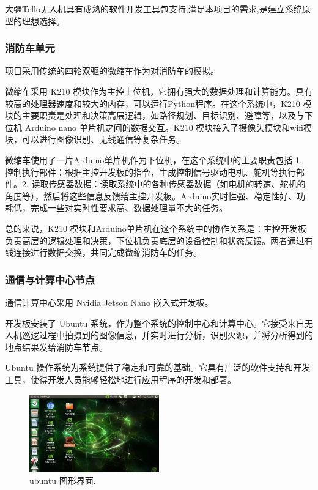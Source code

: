 \documentclass[12pt, a4paper, oneside]{article}
\begin{document}
大疆Tello无人机具有成熟的软件开发工具包支持,满足本项目的需求,是建立系统原型的理想选择。

\subsubsection{消防车单元}

项目采用传统的四轮双驱的微缩车作为对消防车的模拟。

微缩车采用 K210 模块作为主控上位机，它拥有强大的数据处理和计算能力。具有较高的处理器速度和较大的内存，可以运行Python程序。在这个系统中，K210 模块的主要职责是处理和决策高层逻辑，如路径规划、目标识别、避障等，以及与下位机 Arduino nano 单片机之间的数据交互。K210 模块接入了摄像头模块和wifi模块，可以进行图像识别、无线通信等复杂任务。

微缩车使用了一片Arduino单片机作为下位机，在这个系统中的主要职责包括 1. 控制执行部件：根据主控开发板的指令，生成控制信号驱动电机、舵机等执行部件。2. 读取传感器数据：读取系统中的各种传感器数据（如电机的转速、舵机的角度等），然后将这些信息反馈给主控开发板。Arduino实时性强、稳定性好、功耗低，完成一些对实时性要求高、数据处理量不大的任务。

总的来说，K210 模块和Arduino单片机在这个系统中的协作关系是：主控开发板负责高层的逻辑处理和决策，下位机负责底层的设备控制和状态反馈。两者通过有线连接进行数据交换，共同完成微缩消防车的任务。

\subsubsection{通信与计算中心节点}

通信计算中心采用 Nvidia Jetson Nano 嵌入式开发板。

开发板安装了 Ubuntu 系统，作为整个系统的控制中心和计算中心。它接受来自无人机巡逻过程中拍摄到的图像信息，并实时进行分析，识别火源，并将分析得到的地点结果发给消防车节点。

Ubuntu 操作系统为系统提供了稳定和可靠的基础。它具有广泛的软件支持和开发工具，使得开发人员能够轻松地进行应用程序的开发和部署。

\begin{figure}[H]
\centering
\includegraphics[width=0.5\textwidth]{d3eab6b9db9c82d39684dc3e565554c.jpg}
\caption{ubuntu 图形界面.}
\label{ubuntu 图形界面}
\end{figure}
\end{document}
